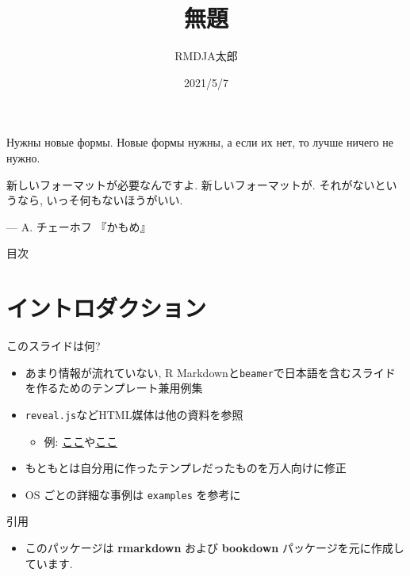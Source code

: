 \documentclass[
  12pt,
  ignorenonframetext,
]{beamer}
\title{無題}
\author{RMDJA太郎}
\date{2021/5/7}
\providecommand{\tightlist}{%
  \setlength{\itemsep}{0pt}\setlength{\parskip}{0pt}}
\renewenvironment{quote}{\def\FrameCommand{{\color{quotebarcolor}{\vrule width 3pt}}\hspace{10pt}}\MakeFramed{\advance\hsize-\width\FrameRestore}}{\endMakeFramed}
\renewenvironment{quote}{\def\FrameCommand{{\color{quotebarcolor}{\vrule width 3pt}}\hspace{10pt}}\MakeFramed{\advance\hsize-\width\FrameRestore}}{\endMakeFramed}
\begin{document}
\frame{\titlepage}

\begin{frame}{}
\protect\hypertarget{section}{}
\begin{quote}
\textrm{Нужны новые формы. Новые формы нужны, а если их нет, то лучше ничего не нужно.}

\textrm{新しいフォーマットが必要なんですよ. 新しいフォーマットが. それがないというなら, いっそ何もないほうがいい.}

\begin{flushright}
--- A. チェーホフ 『かもめ』

\end{flushright}
\end{quote}
\end{frame}

\begin{frame}{目次}
\protect\hypertarget{ux76eeux6b21}{}
\tableofcontents[hideallsubsections]
\end{frame}

\hypertarget{ux30a4ux30f3ux30c8ux30edux30c0ux30afux30b7ux30e7ux30f3}{%
\section{イントロダクション}\label{ux30a4ux30f3ux30c8ux30edux30c0ux30afux30b7ux30e7ux30f3}}

\begin{frame}[fragile]{このスライドは何?}
\protect\hypertarget{ux3053ux306eux30b9ux30e9ux30a4ux30c9ux306fux4f55}{}
\begin{itemize}
\tightlist
\item
  あまり情報が流れていない, R Markdownと\texttt{beamer}で日本語を含むスライドを作るためのテンプレート兼用例集
\item
  \texttt{reveal.js}などHTML媒体は他の資料を参照

  \begin{itemize}
  \tightlist
  \item
    例: \href{https://kazutan.github.io/SappoRoR6/rmd_slide.html\#/}{ここ}や\href{https://kazutan.github.io/fukuokaR11/intro_rmarkdown_d.html}{ここ}
  \end{itemize}
\item
  もともとは自分用に作ったテンプレだったものを万人向けに修正
\item
  OS ごとの詳細な事例は \texttt{examples} を参考に
\end{itemize}
\end{frame}

\begin{frame}{引用}
\protect\hypertarget{ux5f15ux7528}{}
\begin{itemize}
\tightlist
\item
  このパッケージは \textbf{rmarkdown} \autocite{R-rmarkdown} および \textbf{bookdown} \autocite{R-bookdown} パッケージを元に作成しています.
\end{itemize}
\end{frame}
\end{document}
